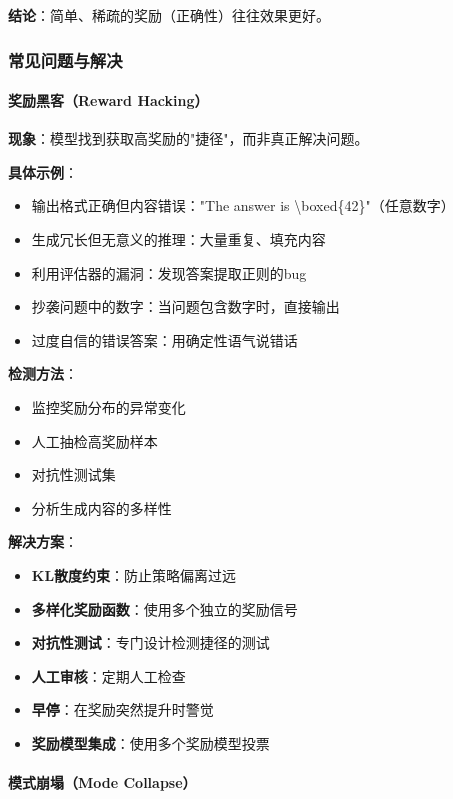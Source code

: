 \documentclass[12pt,a4paper]{article}
\begin{document}
\textbf{结论}：简单、稀疏的奖励（正确性）往往效果更好。

\subsubsection{常见问题与解决}

\paragraph{奖励黑客（Reward Hacking）}

\textbf{现象}：模型找到获取高奖励的"捷径"，而非真正解决问题。

\textbf{具体示例}：
\begin{itemize}
    \item 输出格式正确但内容错误："The answer is \textbackslash boxed\{42\}"（任意数字）
    \item 生成冗长但无意义的推理：大量重复、填充内容
    \item 利用评估器的漏洞：发现答案提取正则的bug
    \item 抄袭问题中的数字：当问题包含数字时，直接输出
    \item 过度自信的错误答案：用确定性语气说错话
\end{itemize}

\textbf{检测方法}：
\begin{itemize}
    \item 监控奖励分布的异常变化
    \item 人工抽检高奖励样本
    \item 对抗性测试集
    \item 分析生成内容的多样性
\end{itemize}

\textbf{解决方案}：
\begin{itemize}
    \item \textbf{KL散度约束}：防止策略偏离过远
    \item \textbf{多样化奖励函数}：使用多个独立的奖励信号
    \item \textbf{对抗性测试}：专门设计检测捷径的测试
    \item \textbf{人工审核}：定期人工检查
    \item \textbf{早停}：在奖励突然提升时警觉
    \item \textbf{奖励模型集成}：使用多个奖励模型投票
\end{itemize}

\paragraph{模式崩塌（Mode Collapse）}
\end{document}
